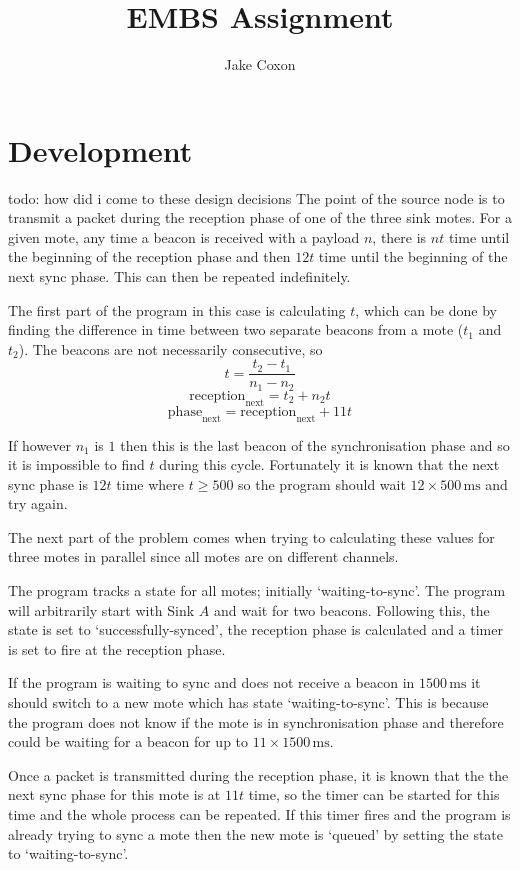 \documentclass{report}
\newcommand\receptiont[1]{\text{reception}_\text{#1}}
\newcommand\phaset[1]{\text{phase}_\text{#1}}
\newcommand{\ms}{\, \mathrm{ms}}
\begin{document}
\title{EMBS Assignment}
\author{Jake Coxon}
\maketitle

\section{Development}

todo: how did i come to these design decisions
The point of the source node is to transmit a packet during the reception phase of one of the three sink motes. For a given mote, any time a beacon is received with a payload $n$, there is $n t$ time until the beginning of the reception phase and then $12 t$ time until the beginning of the next sync phase. This can then be repeated indefinitely.

The first part of the program in this case is calculating $t$, which can be done by finding the difference in time between two separate beacons from a mote ($t_1$ and $t_2$). The beacons are not necessarily consecutive, so 
\[t = \frac{t_2 - t_1}{n_1 - n_2}\]
\[\receptiont{next} = t_2 + n_2 t\]
\[\phaset{next} = \receptiont{next} + 11 t\]

If however $n_1$ is $1$ then this is the last beacon of the synchronisation phase and so it is impossible to find $t$ during this cycle. Fortunately it is known that the next sync phase is $12 t$ time where $t \ge 500$ so the program should wait $12 \times 500\ms$ and try again.

The next part of the problem comes when trying to calculating these values for three motes in parallel since all motes are on different channels. 

The program tracks a state for all motes; initially `waiting-to-sync'. The program will arbitrarily start with Sink $A$ and wait for two beacons. Following this, the state is set to `successfully-synced', the reception phase is calculated and a timer is set to fire at the reception phase.

If the program is waiting to sync and does not receive a beacon in $1500\ms$ it should switch to a new mote which has state `waiting-to-sync'. This is because the program does not know if the mote is in synchronisation phase and therefore could be waiting for a beacon for up to $11 \times 1500\ms$.

Once a packet is transmitted during the reception phase, it is known that the the next sync phase for this mote is at $11 t$ time, so the timer can be started for this time and the whole process can be repeated. If this timer fires and the program is already trying to sync a mote then the new mote is `queued' by setting the state to `waiting-to-sync'.
\end{document}

